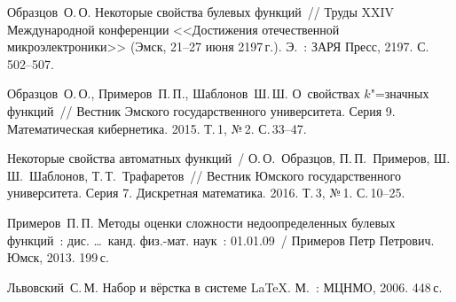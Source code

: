 \begin{lmrarticle}
\begin{lmrreferences}
\item
Образцов~О.\,О. Некоторые свойства булевых функций~// Труды XXIV
Международной конференции <<Достижения отечественной микроэлектроники>>
(Эмск, 21--27 июня 2197\,г.). Э.~: ЗАРЯ Пресс, 2197. С.\,502--507.
\item
Образцов~О.\,О., Примеров~П.\,П., Шаблонов~Ш.\,Ш. О~свойствах
$k$"=значных функций~// Вестник Эмского государственного университета. Серия 9.
Математическая кибернетика. 2015. Т.\,1, №\,2. С.\,33--47.
\item
Некоторые свойства автоматных функций~/ О.\,О.~Образцов, П.\,П.~Примеров,
Ш.\,Ш.~Шаблонов, Т.\,Т.~Трафаретов~// Вестник Юмского государственного
университета. Серия 7.  Дискретная математика. 2016. Т.\,3, №\,1.  С.\,10--25.
\item
Примеров~П.\,П. Методы оценки сложности недоопределенных булевых
функций~: дис.  \ldots\ канд. физ.-мат. наук~: 01.01.09~/ Примеров Петр
Петрович. Юмск, 2013. 199\,с.
\item
Львовский~С.\,М. Набор и вёрстка в системе \LaTeX. М.~: МЦНМО,
2006. 448\,с.
\end{lmrreferences}
\end{lmrarticle}
